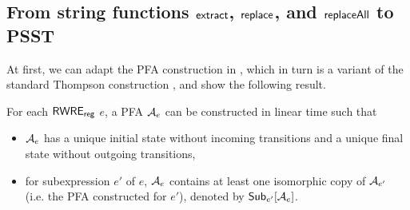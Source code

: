 \subsection{From string functions $\mathsf{extract}$, $\mathsf{replace}$, and $\mathsf{replaceAll}$ to PSST}\label{appendix:sec-extract-replace-to-psst}

At first, we can adapt the PFA construction in \cite{BDM14}, which in turn is a variant of the standard Thompson construction \cite{Thompson68}, and show the following result. 

\begin{proposition}\label{prop-rwre-to-pfa}
    For each ${\sf RWRE_{reg}}$ $e$, a PFA $\mathcal{A}_e$ can be constructed in linear time such that 
    \begin{itemize}
        \item $\mathcal{A}_e$ has a unique initial state without incoming transitions and a unique final state without outgoing transitions,
        \item for subexpression $e'$ of $e$, $\mathcal{A}_e$ contains at least one isomorphic copy of $\mathcal{A}_{e'}$ (i.e. the PFA constructed for $e'$), denoted by ${\sf Sub}_{e'}[\mathcal{A}_e]$. 
    \end{itemize}
\end{proposition}

